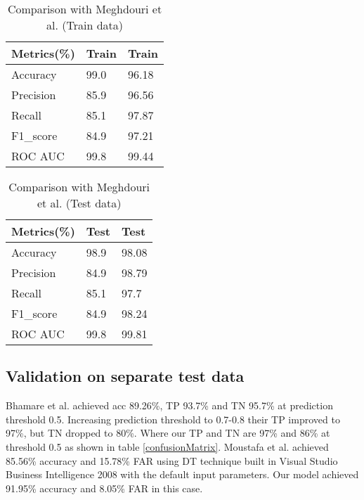 \documentclass[14pt, conference]{IEEEtran}
\begin{document}
\begin{table}
\normalsize
\centering
\caption{Comparison with Meghdouri et al.\cite{meghdouri2018analysis} (Train data)}
\label{performanceComparisonWithMeghdouriTrain}
\renewcommand{\arraystretch}{1.2}
\begin{tabular}{|C{3cm}|C{2cm}|C{2cm}|}
\hline
\textbf{Metrics(\%)} & \textbf{Train\cite{meghdouri2018analysis}} & \textbf{Train} \\ \hline
Accuracy & 99.0 & 96.18\\ \hline
Precision  & 85.9 & 96.56 \\ \hline
Recall  & 85.1 & 97.87 \\ \hline
F1\_score  & 84.9 & 97.21 \\ \hline
ROC AUC  & 99.8 & 99.44 \\ \hline
\end{tabular}
\end{table}

\begin{table}
\normalsize
\centering
\caption{Comparison with Meghdouri et al.\cite{meghdouri2018analysis} (Test data)}
\label{performanceComparisonWithMeghdouriTest}
\renewcommand{\arraystretch}{1.2}
\begin{tabular}{|C{3cm}|C{2cm}|C{2cm}|}
\hline
\textbf{Metrics(\%)} & \textbf{Test\cite{meghdouri2018analysis}} & \textbf{Test} \\ \hline
Accuracy & 98.9 & 98.08\\ \hline
Precision  & 84.9 &  98.79\\ \hline
Recall & 85.1 & 97.7\\ \hline
F1\_score & 84.9 & 98.24 \\ \hline
ROC AUC   & 99.8& 99.81\\ \hline
\end{tabular}
\end{table}

\subsection{Validation on separate test data}
Bhamare et al. \cite{bhamare2016feasibility} achieved acc 89.26\%, TP 93.7\% and TN 95.7\% at prediction threshold 0.5.
Increasing prediction threshold to 0.7-0.8 their TP improved to 97\%, but TN dropped to 80\%. Where our TP and
TN are 97\% and 86\% at threshold 0.5 as shown in table \ref{confusionMatrix}.
Moustafa et al. \cite{moustafa2016evaluation} achieved 85.56\% accuracy and 15.78\% FAR using
DT technique built in Visual Studio Business Intelligence 2008 with the default input parameters. Our model achieved 91.95\% accuracy and 8.05\% FAR in this case.
\end{document}
